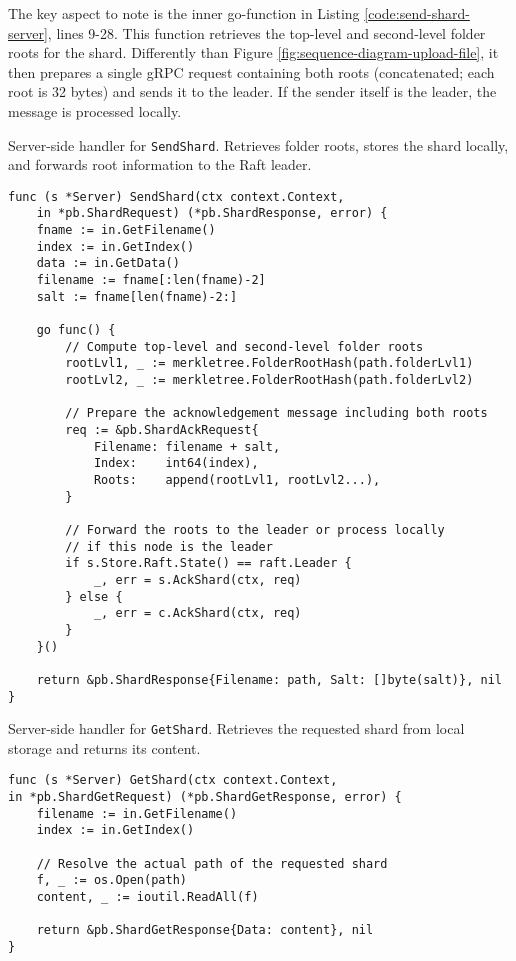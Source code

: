 The key aspect to note is the inner go-function in Listing \ref{code:send-shard-server}, lines 9-28. This function retrieves the top-level and second-level folder roots for the shard. Differently than Figure \ref{fig:sequence-diagram-upload-file}, it then prepares a single gRPC request containing both roots (concatenated; each root is 32 bytes) and sends it to the leader. If the sender itself is the leader, the message is processed locally.

\begin{listing}[H]
\caption{Server-side handler for \texttt{SendShard}. Retrieves folder roots, stores the shard locally, and forwards root information to the Raft leader.}
\label{code:send-shard-server}
\begin{verbatim}
func (s *Server) SendShard(ctx context.Context,
    in *pb.ShardRequest) (*pb.ShardResponse, error) {
    fname := in.GetFilename()
    index := in.GetIndex()
    data := in.GetData()
    filename := fname[:len(fname)-2]
    salt := fname[len(fname)-2:]

    go func() {
        // Compute top-level and second-level folder roots
        rootLvl1, _ := merkletree.FolderRootHash(path.folderLvl1)
        rootLvl2, _ := merkletree.FolderRootHash(path.folderLvl2)

        // Prepare the acknowledgement message including both roots
        req := &pb.ShardAckRequest{
            Filename: filename + salt,
            Index:    int64(index),
            Roots:    append(rootLvl1, rootLvl2...),
        }

        // Forward the roots to the leader or process locally 
        // if this node is the leader
        if s.Store.Raft.State() == raft.Leader {
            _, err = s.AckShard(ctx, req)
        } else {
            _, err = c.AckShard(ctx, req)
        }
    }()

    return &pb.ShardResponse{Filename: path, Salt: []byte(salt)}, nil
}
\end{verbatim}
\end{listing}

\begin{listing}
\caption{Server-side handler for \texttt{GetShard}. Retrieves the requested shard from local storage and returns its content.}
\label{code:get-shard-server}
\begin{verbatim}
func (s *Server) GetShard(ctx context.Context,
in *pb.ShardGetRequest) (*pb.ShardGetResponse, error) {
    filename := in.GetFilename()
    index := in.GetIndex()

    // Resolve the actual path of the requested shard
    f, _ := os.Open(path)
    content, _ := ioutil.ReadAll(f)

    return &pb.ShardGetResponse{Data: content}, nil
}
\end{verbatim}
\end{listing}

